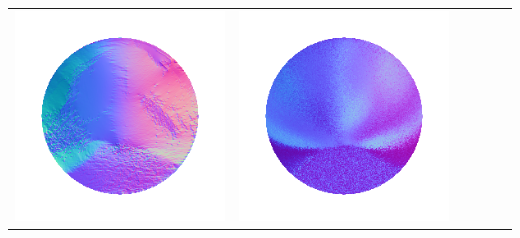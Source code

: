 \begin{center}
\begin{tabularx}{\linewidth}{@{}Y@{}Y@{}Y@{}Y@{}Y@{}Y@{}}
\includegraphics[width=\linewidth]{semisynthetic/20160617_13_yu_out.png} &
\includegraphics[width=\linewidth]{semisynthetic/20160617_13_dpsn_out.png} &

\end{tabularx}
\end{center}
